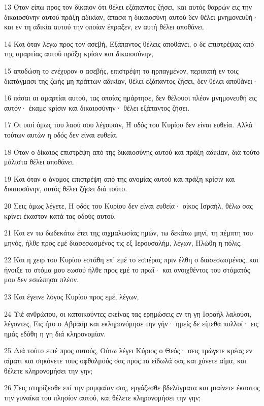 \par 13 Όταν είπω προς τον δίκαιον ότι θέλει εξάπαντος ζήσει, και αυτός θαρρών εις την δικαιοσύνην αυτού πράξη αδικίαν, άπασα η δικαιοσύνη αυτού δεν θέλει μνημονευθή· και εν τη αδικία αυτού την οποίαν έπραξεν, εν αυτή θέλει αποθάνει.
\par 14 Και όταν λέγω προς τον ασεβή, Εξάπαντος θέλεις αποθάνει, ο δε επιστρέψας από της αμαρτίας αυτού πράξη κρίσιν και δικαιοσύνην,
\par 15 αποδώση το ενέχυρον ο ασεβής, επιστρέψη το ηρπαγμένον, περιπατή εν τοις διατάγμασι της ζωής μη πράττων αδικίαν, θέλει εξάπαντος ζήσει, δεν θέλει αποθάνει·
\par 16 πάσαι αι αμαρτίαι αυτού, τας οποίας ημάρτησε, δεν θέλουσι πλέον μνημονευθή εις αυτόν· έκαμε κρίσιν και δικαιοσύνην· θέλει εξάπαντος ζήσει.
\par 17 Οι υιοί όμως του λαού σου λέγουσιν, Η οδός του Κυρίου δεν είναι ευθεία. Αλλά τούτων αυτών η οδός δεν είναι ευθεία.
\par 18 Όταν ο δίκαιος επιστρέψη από της δικαιοσύνης αυτού και πράξη αδικίαν, διά τούτο μάλιστα θέλει αποθάνει.
\par 19 Και όταν ο άνομος επιστρέψη από της ανομίας αυτού και πράξη κρίσιν και δικαιοσύνην, αυτός θέλει ζήσει διά τούτο.
\par 20 Σεις όμως λέγετε, Η οδός του Κυρίου δεν είναι ευθεία· οίκος Ισραήλ, θέλω σας κρίνει έκαστον κατά τας οδούς αυτού.
\par 21 Και εν τω δωδεκάτω έτει της αιχμαλωσίας ημών, τω δεκάτω μηνί, τη πέμπτη του μηνός, ήλθε προς εμέ διασεσωσμένος τις εξ Ιερουσαλήμ, λέγων, Ηλώθη η πόλις.
\par 22 Και η χειρ του Κυρίου εστάθη επ' εμέ το εσπέρας πριν έλθη ο διασεσωσμένος, και ήνοιξε το στόμα μου εωσού ήλθε προς εμέ το πρωΐ· και ανοιχθέντος του στόματός μου δεν εσιώπησα πλέον.
\par 23 Και έγεινε λόγος Κυρίου προς εμέ, λέγων,
\par 24 Υιέ ανθρώπου, οι κατοικούντες εκείνας τας ερημώσεις εν τη γη Ισραήλ λαλούσι, λέγοντες, Εις ήτο ο Αβραάμ και εκληρονόμησε την γήν· ημείς δε είμεθα πολλοί· εις ημάς εδόθη η γη διά κληρονομίαν.
\par 25 Διά τούτο ειπέ προς αυτούς, Ούτω λέγει Κύριος ο Θεός· σεις τρώγετε κρέας εν αίματι και σηκόνετε τους οφθαλμούς σας προς τα είδωλά σας και χύνετε αίμα, και θέλετε κληρονομήσει την γην;
\par 26 Σεις στηρίζεσθε επί την ρομφαίαν σας, εργάζεσθε βδελύγματα και μιαίνετε έκαστος την γυναίκα του πλησίον αυτού, και θέλετε κληρονομήσει την γην;
